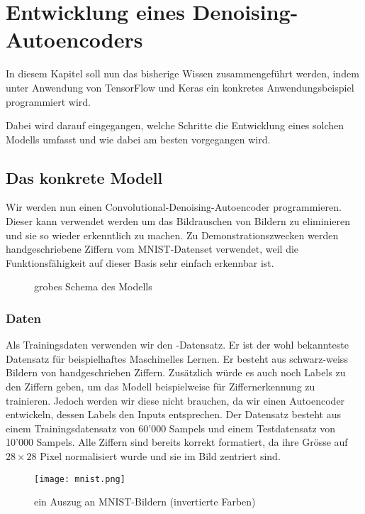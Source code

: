 
\chapter{Entwicklung eines Denoising-Autoencoders}
In diesem Kapitel soll nun das bisherige Wissen zusammengeführt werden, indem
unter Anwendung von TensorFlow und Keras ein konkretes
Anwendungsbeispiel programmiert wird.

Dabei wird darauf eingegangen, welche Schritte die
Entwicklung eines solchen Modells umfasst und wie dabei am besten vorgegangen
wird.

\section{Das konkrete Modell}
Wir werden nun einen Convolutional-Denoising-Autoencoder programmieren.
Dieser kann verwendet werden um das Bildrauschen von Bildern zu eliminieren und
sie so wieder erkenntlich zu machen.
Zu Demonstrationszwecken werden handgeschriebene Ziffern vom MNIST-Datenset
verwendet, weil die Funktionsfähigkeit auf dieser Basis sehr einfach erkennbar ist.

\begin{figure}
  \caption{grobes Schema des Modells}
\end{figure}

\para{}
\subsection{Daten}
Als Trainingsdaten verwenden wir den -Datensatz. Er ist der wohl
bekannteste Datensatz für beispielhaftes Maschinelles Lernen.
Er besteht aus schwarz-weiss Bildern von handgeschrieben Ziffern.
Zusätzlich würde es auch noch Labels zu den Ziffern geben, um das Modell beispielweise
für Ziffernerkennung zu trainieren. Jedoch werden
wir diese nicht brauchen, da wir einen Autoencoder entwickeln, dessen Labels den
Inputs entsprechen.
\para{}
Der Datensatz besteht aus einem Trainingsdatensatz von 60'000 Sampels und einem Testdatensatz
von 10'000 Sampels. Alle Ziffern sind bereits korrekt formatiert, da ihre Grösse
auf $28 \times 28$ Pixel normalisiert wurde und sie im Bild zentriert sind.

\begin{figure}
  \centering
  \texttt{[image: mnist.png]}
  \caption{ein Auszug an MNIST-Bildern (invertierte Farben) \cite{res:mnist_images}}
\end{figure}

